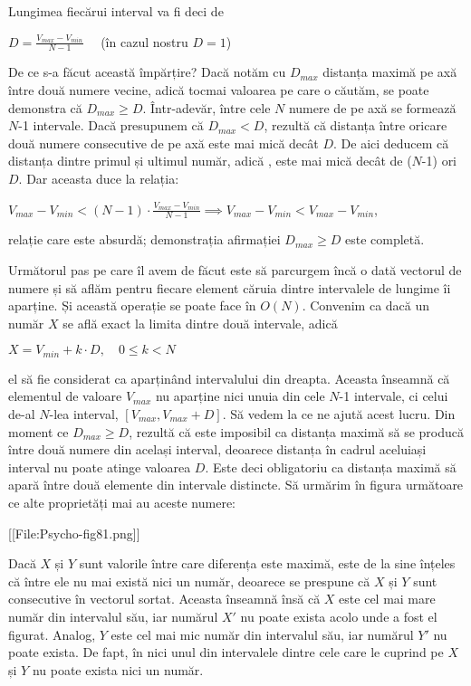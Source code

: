 Lungimea fiecărui interval va fi deci de

$
D = \frac{V_{\mathit{max}} - V_{\mathit{min}}}{N - 1} \quad
$
(în cazul nostru $D = 1$)

De ce s-a făcut această împărțire? Dacă notăm cu $D_{\mathit{max}}$ distanța maximă pe axă între două numere vecine, adică tocmai valoarea pe care o căutăm, se poate demonstra că $D_{\mathit{max}} \geq D$. Într-adevăr, între cele $N$ numere de pe axă se formează $N$-1 intervale. Dacă presupunem că $D_{\mathit{max}} < D$, rezultă că distanța între oricare două numere consecutive de pe axă este mai mică decât $D$. De aici deducem că distanța dintre primul și ultimul număr, adică , este mai mică decât de ($N$-1) ori $D$. Dar aceasta duce la relația:

$
V_{\mathit{max}} - V_{\mathit{min}} < (N - 1) \cdot \frac{V_{\mathit{max}} - V_{\mathit{min}}}{N - 1}
\implies
V_{\mathit{max}} - V_{\mathit{min}} < V_{\mathit{max}} - V_{\mathit{min}}
$,

relație care este absurdă; demonstrația afirmației $D_{\mathit{max}} \geq D$ este completă.

Următorul pas pe care îl avem de făcut este să parcurgem încă o dată vectorul de numere și să aflăm pentru fiecare element căruia dintre intervalele de lungime îi aparține. Și această operație se poate face în $O(N)$. Convenim ca dacă un număr $X$ se află exact la limita dintre două intervale, adică

$
X = V_{\mathit{min}} + k \cdot D, \quad 0 \leq k < N
$

el să fie considerat ca aparținând intervalului din dreapta. Aceasta înseamnă că elementul de valoare $V_{\mathit{max}}$ nu aparține nici unuia din cele $N$-1 intervale, ci celui de-al $N$-lea interval, $[V_{\mathit{max}}, V_{\mathit{max}} + D]$. Să vedem la ce ne ajută acest lucru. Din moment ce $D_{\mathit{max}} \geq D$, rezultă că este imposibil ca distanța maximă să se producă între două numere din același interval, deoarece distanța în cadrul aceluiași interval nu poate atinge valoarea $D$. Este deci obligatoriu ca distanța maximă să apară între două elemente din intervale distincte. Să urmărim în figura următoare ce alte proprietăți mai au aceste numere:

[[File:Psycho-fig81.png]]

Dacă $X$ și $Y$ sunt valorile între care diferența este maximă, este de la sine înțeles că între ele nu mai există nici un număr, deoarece se prespune că $X$ și $Y$ sunt consecutive în vectorul sortat. Aceasta înseamnă însă că $X$ este cel mai mare număr din intervalul său, iar numărul $X'$ nu poate exista acolo unde a fost el figurat. Analog, $Y$ este cel mai mic număr din intervalul său, iar numărul $Y'$ nu poate exista. De fapt, în nici unul din intervalele dintre cele care le cuprind pe $X$ și $Y$ nu poate exista nici un număr.

